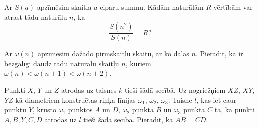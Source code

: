 \documentclass[11pt]{article}
\begin{document}
\begin{problem}[BW.TST.2015.14]
Ar $S(a)$ apzīmēsim skaitļa $a$ ciparu summu. Kādām naturālām $R$ vērtībām var 
atrast tādu naturālu $n$, ka 
\[ \frac{S(n^2)}{S(n)} = R? \]
\end{problem}

\begin{problem}[BW.TST.2015.15]
Ar $\omega(n)$ apzīmēsim dažādo pirmskaitļu skaitu, ar ko dalās $n$. Pierādīt, ka ir bezgalīgi 
daudz tādu naturālu skaitļu $n$, kuriem $\omega(n) < \omega(n+1) < \omega(n+2)$. 
\end{problem}

\begin{problem}[BW.TST.2015.16]
Punkti $X$, $Y$ un $Z$ atrodas uz taisnes $k$ tieši šādā secībā. Uz nogriežņiem 
$XZ$, $XY$, $YZ$ kā diametriem konstruētas riņķa līnijas 
$\omega_1$, $\omega_2$, $\omega_3$. Taisne $l$, kas iet caur punktu $Y$, krusto 
$\omega_1$ punktos $A$ un $D$, $\omega_2$ punktā $B$ un $\omega_3$ punktā $C$ tā, 
ka punkti $A,B,Y,C,D$ atrodas uz $l$ tieši šādā secībā. 
Pierādīt, ka $AB = CD$. 
\end{problem}
\end{document}
